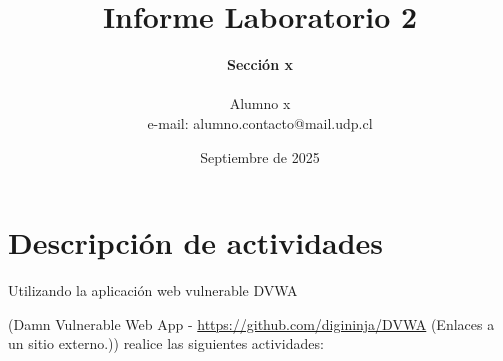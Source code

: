 \documentclass[letter,12pt]{article}
\begin{document}
%
   \title{\Huge{Informe Laboratorio 2}}

   \author{\textbf{Sección x} \\  \\Alumno x \\ e-mail: alumno.contacto@mail.udp.cl}
          
   \date{Septiembre de 2025}

   \maketitle
   
   \tableofcontents
 
  \newpage
  

\section{Descripción de actividades}
Utilizando la aplicación web vulnerable DVWA

(Damn Vulnerable Web App - \href{https://github.com/digininja/DVWA}{https://github.com/digininja/DVWA} (Enlaces a un sitio externo.)) realice las siguientes actividades:
\end{document}
